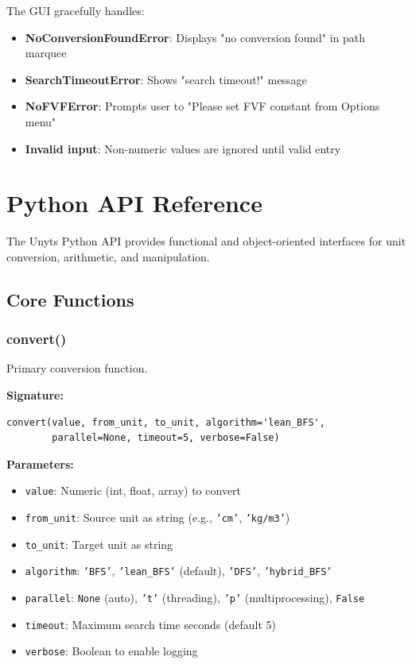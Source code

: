 \documentclass[11pt,a4paper]{report}
\begin{document}
The GUI gracefully handles:

\begin{itemize}
\item \textbf{NoConversionFoundError}: Displays "no conversion found" in path marquee
\item \textbf{SearchTimeoutError}: Shows "search timeout!" message
\item \textbf{NoFVFError}: Prompts user to "Please set FVF constant from Options menu"
\item \textbf{Invalid input}: Non-numeric values are ignored until valid entry
\end{itemize}


\chapter{Python API Reference}

The Unyts Python API provides functional and object-oriented interfaces for unit conversion, arithmetic, and manipulation.

\section{Core Functions}

\subsection{convert()}

Primary conversion function.

\textbf{Signature:}
\begin{lstlisting}[style=pythonstyle]
convert(value, from_unit, to_unit, algorithm='lean_BFS', 
        parallel=None, timeout=5, verbose=False)
\end{lstlisting}

\textbf{Parameters:}
\begin{itemize}
\item \texttt{value}: Numeric (int, float, array) to convert
\item \texttt{from\_unit}: Source unit as string (e.g., \texttt{'cm'}, \texttt{'kg/m3'})
\item \texttt{to\_unit}: Target unit as string
\item \texttt{algorithm}: \texttt{'BFS'}, \texttt{'lean\_BFS'} (default), \texttt{'DFS'}, \texttt{'hybrid\_BFS'}
\item \texttt{parallel}: \texttt{None} (auto), \texttt{'t'} (threading), \texttt{'p'} (multiprocessing), \texttt{False}
\item \texttt{timeout}: Maximum search time seconds (default 5)
\item \texttt{verbose}: Boolean to enable logging
\end{itemize}
\end{document}
